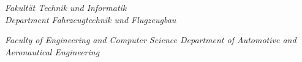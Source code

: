 \begin{titlepage}
{  %
    \begin{minipage}{0.49\linewidth}
        \begin{flushleft}
        \textit{Fakultät Technik und Informatik\\
        Department Fahrzeugtechnik und Flugzeugbau}
    \end{flushleft}
    \end{minipage}
    \hfill
    \begin{minipage}{0.49\linewidth}
        \begin{flushright}
            \textit{Faculty of Engineering and Computer Science
            Department of Automotive and\\
            Aeronautical Engineering}
        \end{flushright}
    \end{minipage}
}



\end{titlepage}